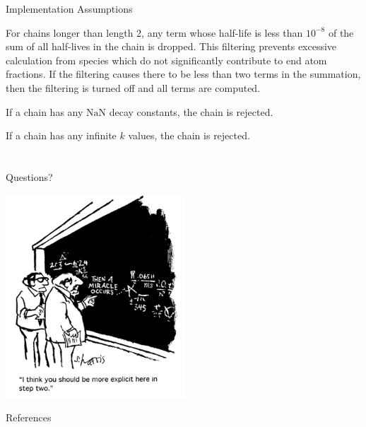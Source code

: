 \documentclass[xcolor=x11names,compress]{beamer}
\begin{document}

\begin{frame}{Implementation Assumptions}

    \vspace*{1em}
    For chains longer than length 2, any 
    term whose half-life is less than $10^{-8}$ of the sum of all 
    half-lives in the chain is dropped. This filtering prevents excessive
    calculation from species which do not significantly contribute to 
    end atom fractions. If the filtering causes there to be less than 
    two terms in the summation, then the filtering is turned off and all
    terms are computed.

    \vspace*{1em}
    If a chain has any $\mathrm{NaN}$ decay constants, the chain is rejected.

    \vspace*{1em}
    If a chain has any infinite $k$ values, the chain is rejected.

\end{frame}


\section*{}
\begin{frame}[fragile]{Questions?}

    \begin{center}
    \includegraphics[height=3in,clip]{questions-comic.png}
    \end{center}

\end{frame}

\begin{frame}[allowframebreaks]{References}
	
    
\end{frame}
\end{document}
